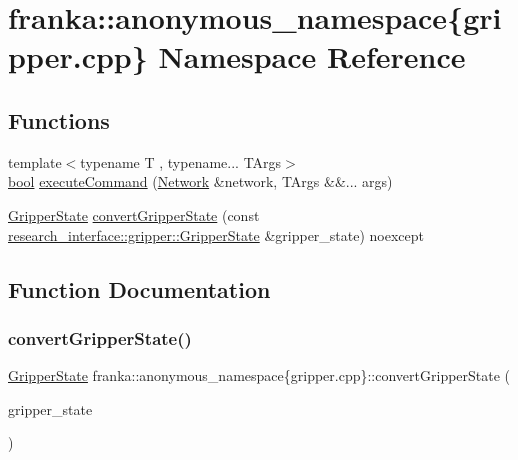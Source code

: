 \hypertarget{namespacefranka_1_1anonymous__namespace_02gripper_8cpp_03}{}\section{franka\+:\+:anonymous\+\_\+namespace\{gripper.\+cpp\} Namespace Reference}
\label{namespacefranka_1_1anonymous__namespace_02gripper_8cpp_03}
\subsection*{Functions}
\begin{DoxyCompactItemize}
\item 
{\footnotesize template$<$typename T , typename... T\+Args$>$ }\\\hyperlink{classbool}{bool} \hyperlink{namespacefranka_1_1anonymous__namespace_02gripper_8cpp_03_a024993add0f6393c296d96275f33b2dc}{execute\+Command} (\hyperlink{classfranka_1_1Network}{Network} \&network, T\+Args \&\&... args)
\item 
\hyperlink{structfranka_1_1GripperState}{Gripper\+State} \hyperlink{namespacefranka_1_1anonymous__namespace_02gripper_8cpp_03_af656eaa1cbb4150840e47175fed828e8}{convert\+Gripper\+State} (const \hyperlink{structresearch__interface_1_1gripper_1_1GripperState}{research\+\_\+interface\+::gripper\+::\+Gripper\+State} \&gripper\+\_\+state) noexcept
\end{DoxyCompactItemize}


\subsection{Function Documentation}
\mbox{\label{namespacefranka_1_1anonymous__namespace_02gripper_8cpp_03_af656eaa1cbb4150840e47175fed828e8}} 
\subsubsection{\texorpdfstring{convert\+Gripper\+State()}{convertGripperState()}}
{\footnotesize\ttfamily \hyperlink{structfranka_1_1GripperState}{Gripper\+State} franka\+::anonymous\+\_\+namespace\{gripper.\+cpp\}\+::convert\+Gripper\+State (\begin{DoxyParamCaption}\item[{const \hyperlink{structresearch__interface_1_1gripper_1_1GripperState}{research\+\_\+interface\+::gripper\+::\+Gripper\+State} \&}]{gripper\+\_\+state }\end{DoxyParamCaption})\hspace{0.3cm}{\ttfamily [noexcept]}}



